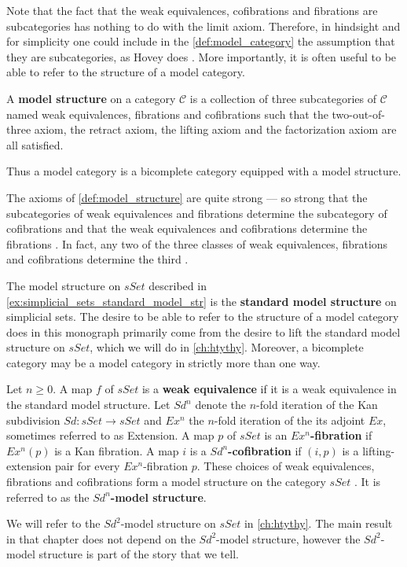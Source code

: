 Note that the fact that the weak equivalences, cofibrations and fibrations are subcategories has nothing to do with the limit axiom. Therefore, in hindsight and for simplicity one could include in the \cref{def:model_category} the assumption that they are subcategories, as Hovey does \cite[Def.~1.1.3, p.~3]{Ho99}. More importantly, it is often useful to be able to refer to the structure of a model category.
\begin{definition}\label{def:model_structure}
A \textbf{model structure} on a category $\mathscr{C}$ is a collection of three subcategories of $\mathscr{C}$ named weak equivalences, fibrations and cofibrations such that the two-out-of-three axiom, the retract axiom, the lifting axiom and the factorization axiom are all satisfied.
\end{definition}
\noindent Thus a model category is a bicomplete category equipped with a model structure.

The axioms of \cref{def:model_structure} are quite strong --- so strong that the subcategories of weak equivalences and fibrations determine the subcategory of cofibrations \cite[Prop.~7.2.3~(1), p.~111]{Hi03} and that the weak equivalences and cofibrations determine the fibrations \cite[Prop.~7.2.3~(3), p.~111]{Hi03}. In fact, any two of the three classes of weak equivalences, fibrations and cofibrations determine the third \cite[Prop.~7.2.7, p.~112]{Hi03}.

The model structure on $sSet$ described in \cref{ex:simplicial_sets_standard_model_str} is the \textbf{standard model structure} on simplicial sets. The desire to be able to refer to the structure of a model category does in this monograph primarily come from the desire to lift the standard model structure on $sSet$, which we will do in \cref{ch:htythy}. Moreover, a bicomplete category may be a model category in strictly more than one way.
\begin{example}\label{ex:sd^n_model_structures}
Let $n\geq 0$. A map $f$ of $sSet$ is a \textbf{weak equivalence} if it is a weak equivalence in the standard model structure. Let $Sd^n$ denote the $n$-fold iteration of the Kan subdivision $Sd:sSet\to sSet$ and $Ex^n$ the $n$-fold iteration of the its adjoint $Ex$, sometimes referred to as Extension. A map $p$ of $sSet$ is an \textbf{$Ex^n$-fibration} if $Ex^n(p)$ is a Kan fibration. A map $i$ is a \textbf{$Sd^n$-cofibration} if $(i,p)$ is a lifting-extension pair for every $Ex^n$-fibration $p$. These choices of weak equivalences, fibrations and cofibrations form a model structure on the category $sSet$ \cite[Thm.~1.1~(1), p.~274]{Ja13}. It is referred to as the \textbf{$Sd^n$-model structure}.
\end{example}
\noindent We will refer to the $Sd^2$-model structure on $sSet$ in \cref{ch:htythy}. The main result in that chapter does not depend on the $Sd^2$-model structure, however the $Sd^2$-model structure is part of the story that we tell.



